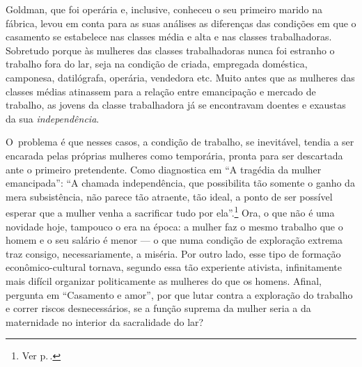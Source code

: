 Goldman, que foi operária e, inclusive, conheceu o seu primeiro
marido na fábrica, levou em conta para as 
suas análises as diferenças das condições em que o casamento se
estabelece nas classes média e alta e nas classes
trabalhadoras. Sobretudo porque às mulheres das classes
trabalhadoras nunca foi estranho o trabalho fora do lar, seja na
condição de criada, empregada doméstica, camponesa, datilógrafa,
operária, vendedora etc. Muito antes que as mulheres das classes médias
atinassem para a relação entre emancipação e mercado de trabalho, as
jovens da classe trabalhadora já se encontravam doentes e exaustas da
sua \textit{independência}.

O~problema é que nesses casos, a condição de
trabalho, se inevitável, tendia a ser encarada pelas próprias mulheres
como temporária, pronta para ser descartada ante o primeiro pretendente.
Como diagnostica em ``A tragédia da mulher emancipada'': ``A
chamada independência, que possibilita tão somente o ganho da mera
subsistência, não parece tão atraente, tão ideal, a ponto de ser possível
esperar que a mulher venha a sacrificar tudo por ela''.\footnote{Ver p.\,\pageref{ganho}.} Ora, o que não é
uma novidade hoje, tampouco o era na época: a mulher faz o mesmo
trabalho que o homem e o seu salário é menor --- o que numa condição de
exploração extrema traz consigo, necessariamente, a miséria. Por outro
lado, esse tipo de formação econômico-cultural tornava, segundo essa tão
experiente ativista, infinitamente mais difícil organizar
politicamente as mulheres do que os homens. Afinal, pergunta em
``Casamento e amor'', por que lutar contra a exploração do trabalho e
correr riscos desnecessários, se a função suprema da mulher seria a da
maternidade no interior da sacralidade do lar?

